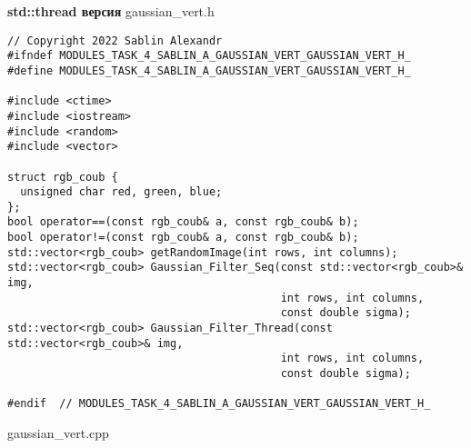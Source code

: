 \documentclass{report}
\begin{document}
\textbf{std::thread версия}
\newline
\newline gaussian\_vert.h
\begin{lstlisting}
// Copyright 2022 Sablin Alexandr
#ifndef MODULES_TASK_4_SABLIN_A_GAUSSIAN_VERT_GAUSSIAN_VERT_H_
#define MODULES_TASK_4_SABLIN_A_GAUSSIAN_VERT_GAUSSIAN_VERT_H_

#include <ctime>
#include <iostream>
#include <random>
#include <vector>

struct rgb_coub {
  unsigned char red, green, blue;
};
bool operator==(const rgb_coub& a, const rgb_coub& b);
bool operator!=(const rgb_coub& a, const rgb_coub& b);
std::vector<rgb_coub> getRandomImage(int rows, int columns);
std::vector<rgb_coub> Gaussian_Filter_Seq(const std::vector<rgb_coub>& img,
                                          int rows, int columns,
                                          const double sigma);
std::vector<rgb_coub> Gaussian_Filter_Thread(const std::vector<rgb_coub>& img,
                                          int rows, int columns,
                                          const double sigma);

#endif  // MODULES_TASK_4_SABLIN_A_GAUSSIAN_VERT_GAUSSIAN_VERT_H_

\end{lstlisting}
gaussian\_vert.cpp
\end{document}
